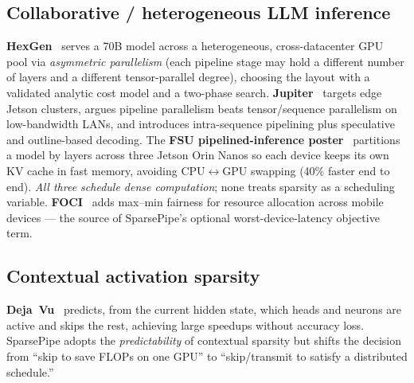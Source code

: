 \documentclass[11pt]{article}
\newcommand{\term}[1]{\textbf{\color{accent!85!black}#1}}
\begin{document}
\subsection{Collaborative / heterogeneous LLM inference}
\term{HexGen}~\cite{hexgen} serves a 70B model across a heterogeneous, cross-datacenter GPU
pool via \emph{asymmetric parallelism} (each pipeline stage may hold a different number of
layers and a different tensor-parallel degree), choosing the layout with a validated
analytic cost model and a two-phase search. \term{Jupiter}~\cite{jupiter} targets edge
Jetson clusters, argues pipeline parallelism beats tensor/sequence parallelism on
low-bandwidth LANs, and introduces intra-sequence pipelining plus speculative and
outline-based decoding. The \term{FSU pipelined-inference poster}~\cite{poster} partitions a
model by layers across three Jetson Orin Nanos so each device keeps its own KV cache in fast
memory, avoiding CPU$\leftrightarrow$GPU swapping (40\% faster end to end).
\emph{All three schedule dense computation}; none treats sparsity as a scheduling variable.
\term{FOCI}~\cite{foci} adds max--min fairness for resource allocation across mobile devices
--- the source of SparsePipe's optional worst-device-latency objective term.

\subsection{Contextual activation sparsity}
\term{Deja~Vu}~\cite{dejavu} predicts, from the current hidden state, which heads and neurons
are active and skips the rest, achieving large speedups without accuracy loss. SparsePipe
adopts the \emph{predictability} of contextual sparsity but shifts the decision from ``skip
to save FLOPs on one GPU'' to ``skip/transmit to satisfy a distributed schedule.''
\end{document}
